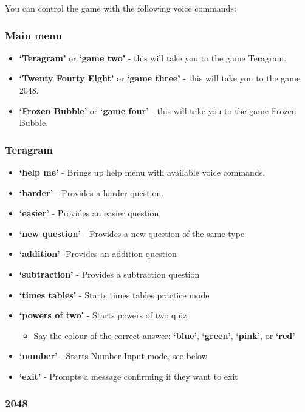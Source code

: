 \documentclass[11pt, oneside]{article}
\begin{document}
You can control the game with the following voice commands:

\subsubsection{Main menu}

\begin{itemize}
  \item {\bf`Teragram'} or {\bf`game two'}  - this will take you to the game Teragram.
  \item {\bf`Twenty Fourty Eight'} or {\bf`game three'} - this will take you to the game 2048.
  \item {\bf`Frozen Bubble'} or {\bf`game four'} - this will take you to the game Frozen Bubble.
\end{itemize}

\subsubsection{Teragram}

\begin{itemize}
  \item {\bf`help me'} - Brings up help menu with available voice commands. 
  \item {\bf`harder'} - Provides a harder question. 
  \item {\bf`easier'} - Provides an easier question.
  \item {\bf`new question'} - Provides a new question of the same type
  \item {\bf`addition'} -Provides an addition question
  \item {\bf`subtraction'} - Provides a subtraction question
  \item {\bf`times tables'} - Starts times tables practice mode
  \item {\bf`powers of two'} - Starts powers of two quiz
  \begin{itemize}
  	\item Say the colour of the correct answer: {\bf`blue'}, {\bf`green'}, {\bf`pink'}, or {\bf`red'}
  \end{itemize}
  \item {\bf`number'} - Starts Number Input mode, see below
  \item {\bf`exit'} - Prompts a message confirming if they want to exit
 
\end{itemize}

\subsubsection{2048}
\end{document}
